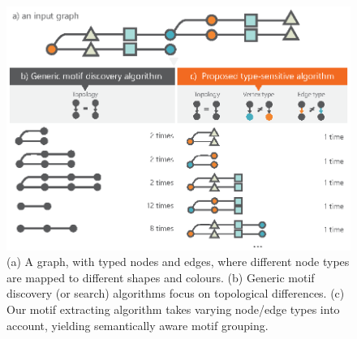 \begin{table}[!t]
\centering
\caption{Some commonly used motif finding algorithms.}
\vspace{1mm}
\vspace{-2mm}
\label{tab:motif-algorithms}
\end{table}

\begin{figure}[t!]
\centering
\includegraphics[scale=.8]{images/automacron/algorithm-differences.eps}
\caption{(a) A graph, with typed nodes and edges, where different node types are mapped to different shapes and colours.
(b) Generic motif discovery (or search) algorithms focus on topological differences.
(c) Our motif extracting algorithm takes varying node/edge types into account, yielding semantically aware motif grouping.
}
\vspace{-5mm}
\label{fig:new-algorithm-considerations}
\end{figure}

